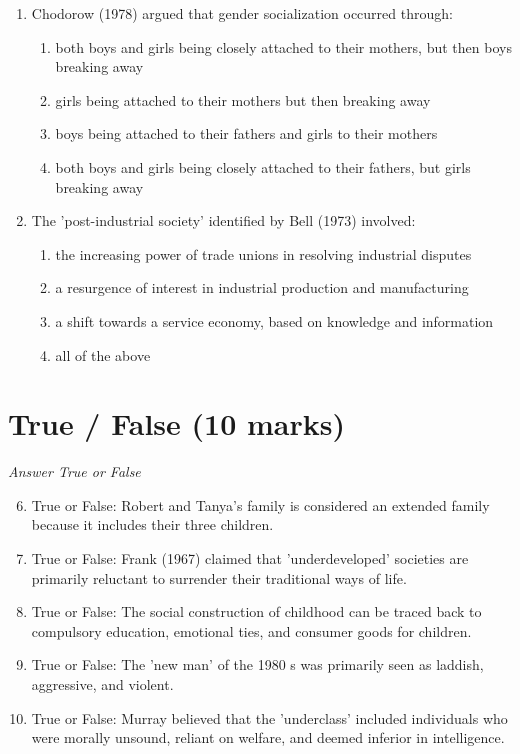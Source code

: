 \documentclass[12pt]{article}
\begin{document}
\begin{enumerate}[label=\arabic*.]
\item Chodorow (1978) argued that gender socialization occurred through:
\begin{enumerate}[label=(\alph*)]
    \item both boys and girls being closely attached to their mothers, but then boys breaking away
    \item girls being attached to their mothers but then breaking away
    \item boys being attached to their fathers and girls to their mothers
    \item both boys and girls being closely attached to their fathers, but girls breaking away
\end{enumerate}
\item The 'post-industrial society' identified by Bell (1973) involved:
\begin{enumerate}[label=(\alph*)]
    \item the increasing power of trade unions in resolving industrial disputes
    \item a resurgence of interest in industrial production and manufacturing
    \item a shift towards a service economy, based on knowledge and information
    \item all of the above
\end{enumerate}
\end{enumerate}

\section*{True / False (10 marks)}
\textit{Answer True or False}
\begin{enumerate}[label=\arabic*.]
\setcounter{enumi}{5}
\item True or False: Robert and Tanya's family is considered an extended family because it includes their three children.
\item True or False: Frank (1967) claimed that 'underdeveloped' societies are primarily reluctant to surrender their traditional ways of life.
\item True or False: The social construction of childhood can be traced back to compulsory education, emotional ties, and consumer goods for children.
\item True or False: The 'new man' of the 1980 s was primarily seen as laddish, aggressive, and violent.
\item True or False: Murray believed that the 'underclass' included individuals who were morally unsound, reliant on welfare, and deemed inferior in intelligence.
\end{enumerate}
\end{document}

